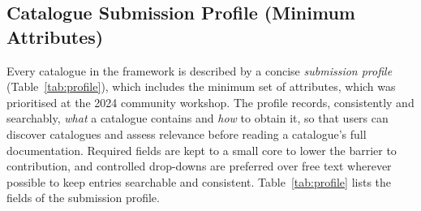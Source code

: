 \documentclass[11pt]{article}
\begin{document}
\subsection{Catalogue Submission Profile (Minimum Attributes)}
\label{sec:profile}
Every catalogue in the framework is described by a concise \emph{submission profile} (Table~\ref{tab:profile}), which includes the minimum set of attributes, which was prioritised at the 2024 community workshop. The profile records, consistently and searchably, \emph{what} a catalogue contains and \emph{how} to obtain it, so that users can discover catalogues and assess relevance before reading a catalogue's full documentation. Required fields are kept to a small core to lower the barrier to contribution, and controlled drop-downs are preferred over free text wherever possible to keep entries searchable and consistent. Table~\ref{tab:profile} lists the fields of the submission profile.
\end{document}

